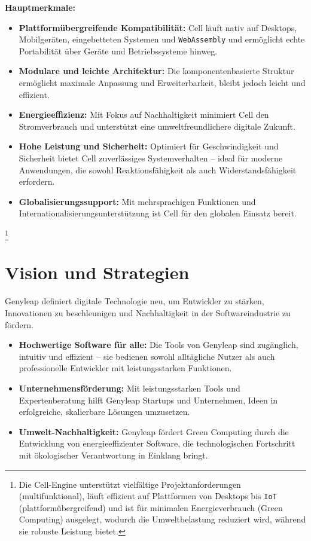 \documentclass[a4paper,12pt,openany]{book}
\begin{document}
\textbf{Hauptmerkmale:}
\begin{itemize}
    \item \textbf{Plattformübergreifende Kompatibilität:} Cell läuft nativ auf Desktops, Mobilgeräten, eingebetteten Systemen und \texttt{WebAssembly} und ermöglicht echte Portabilität über Geräte und Betriebssysteme hinweg.
    \item \textbf{Modulare und leichte Architektur:} Die komponentenbasierte Struktur ermöglicht maximale Anpassung und Erweiterbarkeit, bleibt jedoch leicht und effizient.
    \item \textbf{Energieeffizienz:} Mit Fokus auf Nachhaltigkeit minimiert Cell den Stromverbrauch und unterstützt eine umweltfreundlichere digitale Zukunft.
    \item \textbf{Hohe Leistung und Sicherheit:} Optimiert für Geschwindigkeit und Sicherheit bietet Cell zuverlässiges Systemverhalten – ideal für moderne Anwendungen, die sowohl Reaktionsfähigkeit als auch Widerstandsfähigkeit erfordern.
    \item \textbf{Globalisierungssupport:} Mit mehrsprachigen Funktionen und Internationalisierungsunterstützung ist Cell für den globalen Einsatz bereit.
\end{itemize}

\footnote{Die Cell-Engine unterstützt vielfältige Projektanforderungen (multifunktional), läuft effizient auf Plattformen von Desktops bis \texttt{IoT} (plattformübergreifend) und ist für minimalen Energieverbrauch (Green Computing) ausgelegt, wodurch die Umweltbelastung reduziert wird, während sie robuste Leistung bietet.}

\chapter{Vision und Strategien}

Genyleap definiert digitale Technologie neu, um Entwickler zu stärken, Innovationen zu beschleunigen und Nachhaltigkeit in der Softwareindustrie zu fördern.

\begin{itemize}
    \item \textbf{Hochwertige Software für alle:} Die Tools von Genyleap sind zugänglich, intuitiv und effizient – sie bedienen sowohl alltägliche Nutzer als auch professionelle Entwickler mit leistungsstarken Funktionen.
    \item \textbf{Unternehmensförderung:} Mit leistungsstarken Tools und Expertenberatung hilft Genyleap Startups und Unternehmen, Ideen in erfolgreiche, skalierbare Lösungen umzusetzen.
    \item \textbf{Umwelt-Nachhaltigkeit:} Genyleap fördert Green Computing durch die Entwicklung von energieeffizienter Software, die technologischen Fortschritt mit ökologischer Verantwortung in Einklang bringt.
\end{itemize}
\end{document}
